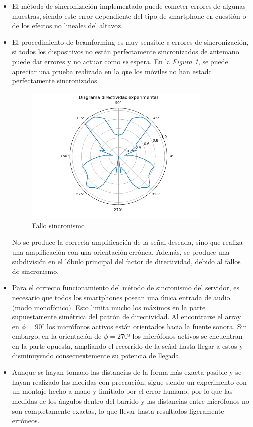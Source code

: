 \documentclass[a4paper,11pt]{book}
\begin{document}
\begin{itemize}

\item El método de sincronización implementado puede cometer errores de algunas muestras, siendo este error dependiente del tipo de smartphone en cuestión o de los efectos no lineales del altavoz.
\item El procedimiento de beamforming es muy sensible a errores de sincronización, si todos los dispositivos no están perfectamente sincronizados de antemano puede dar errores y no actuar como se espera. En la \textit{Figura \ref{error_sincro}}, se puede apreciar una prueba realizada en la que los móviles no han estado perfectamente sincronizados.

\begin{figure}[hbtp]
\centering
\includegraphics[width = 9cm]{FIGURAS/directividad_MALA.png}
\caption{Fallo sincronismo}
\label{error_sincro}
\end{figure}

No se produce la correcta amplificación de la señal deseada, sino que realiza una amplificación con una orientación errónea. Además, se produce una subdivisión en el lóbulo principal del factor de directividad, debido al fallos de sincronismo.

\item Para el correcto funcionamiento del método de sincronismo del servidor, es necesario que todos los smartphones posean una única entrada de audio (modo monofónico). Esto limita mucho los máximos en la parte supuestamente simétrica del patrón de directividad. Al encontrarse el array en $\phi = 90º$ los micrófonos activos están orientados hacia la fuente sonora. Sin embargo, en la orientación de $\phi = 270º$ los micrófonos activos se encuentran en la parte opuesta, ampliando el recorrido de la señal hasta llegar a estos y disminuyendo consecuentemente su potencia de llegada.

\item Aunque se hayan tomado las distancias de la forma más exacta posible y se hayan realizado las medidas con precaución, sigue siendo un experimento con un montaje hecho a mano y limitado por el error humano, por lo que las medidas de los ángulos dentro del barrido y las distancias entre micrófonos no son completamente exactas, lo que llevar hasta resultados ligeramente erróneos.

\end{itemize}
\end{document}
